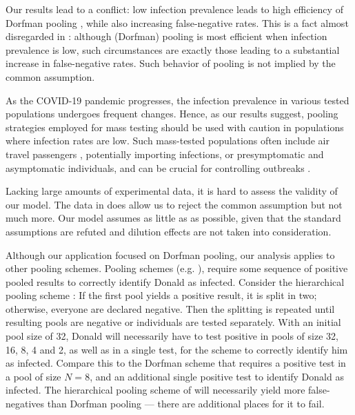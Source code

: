 \documentclass{article}
\begin{document}
Our results lead to a conflict: low infection prevalence leads to high
efficiency of Dorfman pooling \cite{DorfmanYuvalDor}, while also
increasing false-negative rates. This is a fact almost disregarded in
\cite{DorfmanYuvalDor}: although (Dorfman) pooling is most efficient
when infection prevalence is low, such circumstances are exactly those
leading to a substantial increase in false-negative rates. Such
behavior of pooling is not implied by the common assumption.

As the COVID-19 pandemic progresses, the infection prevalence
in various tested populations undergoes frequent changes. Hence, as
our results suggest, pooling strategies employed for mass testing should be
used with caution in populations where infection rates are low. Such
mass-tested populations often include air travel passengers
\cite{JTM,RobinHood}, potentially importing infections, or
presymptomatic and asymptomatic individuals, and can be crucial for
controlling outbreaks \cite{MinaScience}.


Lacking large amounts of experimental data, it is hard to assess the
validity of our model. The data in \cite{Salazar} does allow us to
reject the common assumption but not much more. Our model assumes as
little as as possible, given that the standard assumptions are refuted
and dilution effects are not taken into consideration.

Although our application focused on Dorfman pooling, our analysis
applies to other pooling schemes. Pooling schemes
(e.g. \cite{MatrixPooling,Lion, Kim}), require some sequence of
positive pooled results to correctly identify Donald as
infected. Consider the hierarchical pooling scheme \cite{Lion, Kim}:
If the first pool yields a positive result, it is split in two;
otherwise, everyone are declared negative. Then the splitting is
repeated until resulting pools are negative or individuals are tested
separately. With an initial pool size of 32, Donald will necessarily
have to test positive in pools of size 32, 16, 8, 4 and 2, as well as
in a single test, for the scheme to correctly identify him as
infected. Compare this to the Dorfman scheme that requires a positive
test in a pool of size $N=8$, and an additional single positive test
to identify Donald as infected. The hierarchical pooling scheme of
\cite{Lion, Kim} will necessarily yield more false-negatives than
Dorfman pooling --- there are additional places for it to fail.
\end{document}
